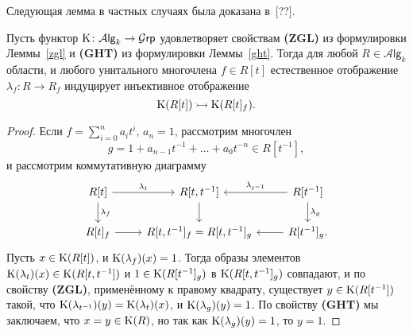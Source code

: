 \documentclass[oneside, 11pt]{amsart} \pdfoutput=1
\begin{document}
Следующая лемма в частных случаях была доказана в~[??].
\begin{lemma}
\label{lmp}
Пусть функтор ${\mathrm{K}}\colon\mathcal A\mathsf{lg}_k\rightarrow\mathcal G\mathsf{rp}$ удовлетворяет свойствам {\bf(ZGL)} из формулировки Леммы~\ref{zgl} и {\bf(GHT)} из формулировки Леммы~\ref{ght}. Тогда для любой $R\in\mathcal A\mathsf{lg}_k$ области, и любого унитального многочлена $f\in R[t]$ естественное отображение $\lambda_f\colon R\rightarrow R_f$ индуцирует инъективное отображение
$$
{\mathrm{K}}(R[t])\rightarrowtail{\mathrm{K}}(R[t]_f).
$$
\end{lemma}
\begin{proof}
Если $f=\sum_{i=0}^n a_it^i$, $a_n=1$, рассмотрим многочлен $$g=1+a_{n-1}t^{-1}+\ldots+a_0t^{-n}\in R[t^{-1}],$$ и рассмотрим коммутативную диаграмму
$$\begin{tikzcd}
R[t] \ar{r}{\lambda_t} \ar{d}{\lambda_f} & R[t, t^{-1}] \ar{d} & R[t^{-1}] \ar{l}[']{\lambda_{t^{-1}}} \ar{d}{\lambda_g}\\
R[t]_f \ar{r} & R[t, t^{-1}]_f = R[t, t^{-1}]_g & R[t^{-1}]_g. \ar{l}
\end{tikzcd}$$
Пусть $x\in{\mathrm{K}}(R[t])$, и ${\mathrm{K}}(\lambda_f)(x)=1$. Тогда образы элементов ${\mathrm{K}}(\lambda_t)(x)\in{\mathrm{K}}(R[t,t^{-1}])$ и $1\in{\mathrm{K}}(R[t^{-1}]_g)$ в ${\mathrm{K}}(R[t,t^{-1}]_g)$ совпадают, и по свойству {\bf(ZGL)}, применённому к правому квадрату, существует $y\in{\mathrm{K}}(R[t^{-1}])$ такой, что ${\mathrm{K}}(\lambda_{t^{-1}})(y)={\mathrm{K}}(\lambda_t)(x)$, и ${\mathrm{K}}(\lambda_{g})(y)=1$. По свойству {\bf(GHT)} мы заключаем, что $x=y\in{\mathrm{K}}(R)$, но так как ${\mathrm{K}}(\lambda_{g})(y)=1$, то $y=1$.
\end{proof}
\end{document}
